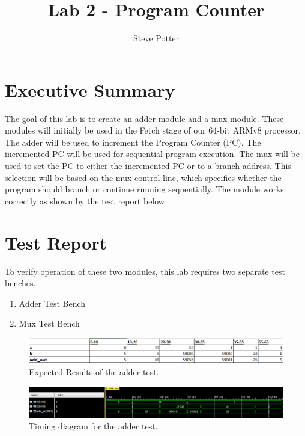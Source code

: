 \documentclass{article}
\author{Steve Potter}
\title{Lab 2 - Program Counter}
\begin{document}
	\maketitle
	
	\section{Executive Summary}
	The goal of this lab is to create an adder module and a mux module.  These modules will initially be used in the Fetch stage of our 64-bit ARMv8 processor.  The adder will be used to increment the Program Counter (PC).  The incremented PC will be used for sequential program execution.  The mux will be used to set the PC to either the incremented PC or to a branch address.  This selection will be based on the mux control line, which specifies whether the program should branch or continue running sequentially.  The module works correctly as shown by the test report below
	
	\section{Test Report}
	To verify operation of these two modules, this lab requires two separate test benches.
	\begin{enumerate}
		\item Adder Test Bench
		\item Mux Test Bench
	\end{enumerate}
	
	\begin{figure}[H]
		\begin{center}
			\caption{Expected Results of the adder test.}\label{fig:ert_addertest}
			\includegraphics[width=1.0\textwidth]{../images/ert_adder_test.png}
		\end{center}
	\end{figure}
	
	\begin{figure}[H]
		\begin{center}
			\caption{Timing diagram for the adder test.}\label{fig:addertest}
			\includegraphics[width=1.0\textwidth]{../images/adder_test.png}
		\end{center}
	\end{figure}
	
\end{document}
